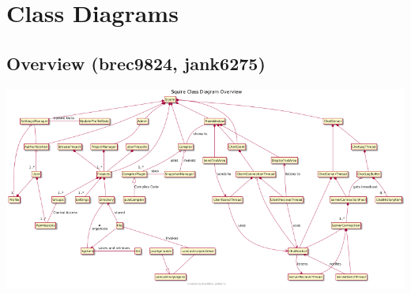 \documentclass[11pt]{report}
\begin{document}
\chapter{Class Diagrams}
\section{Overview (brec9824, jank6275)}
    \begin{minipage}{1\textwidth}
        \begin{center}
            \includegraphics[width=1\textwidth]{diagrams/class-overview}
        \end{center}
    \end{minipage}

\newpage
\end{document}

